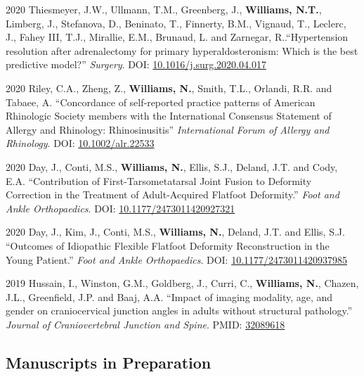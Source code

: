 \documentclass[12pt,letterpaper]{report}
\begin{document}
    \begin{tablist}
    
        	\item[2020] \tab Thiesmeyer, J.W., Ullmann, T.M., Greenberg, J., \textbf{Williams, N.T.}, Limberg, J., Stefanova, D., Beninato, T., Finnerty, B.M., Vignaud, T., Leclerc, J., Fahey III, T.J., Mirallie, E.M., Brunaud, L. and Zarnegar, R..\enquote{Hypertension resolution after adrenalectomy for primary hyperaldosteronism: Which is the best predictive model?} \textit{Surgery}. DOI: \href{https://doi.org/10.1016/j.surg.2020.04.017}{10.1016/j.surg.2020.04.017}  
	
	\item[2020] \tab Riley, C.A., Zheng, Z., \textbf{Williams, N.}, Smith, T.L., Orlandi, R.R. and Tabaee, A. \enquote{Concordance of self‐reported practice patterns of American Rhinologic Society members with the International Consensus Statement of Allergy and Rhinology: Rhinosinusitis} \textit{International Forum of Allergy and Rhinology}. DOI: \href{https://doi.org/10.1002/alr.22533}{10.1002/alr.22533} 
	
	\item[2020] \tab Day, J., Conti, M.S., \textbf{Williams, N.}, Ellis, S.J., Deland, J.T. and Cody, E.A. \enquote{Contribution of First-Tarsometatarsal Joint Fusion to Deformity Correction in the Treatment of Adult-Acquired Flatfoot Deformity.} \textit{Foot and Ankle Orthopaedics}. DOI: \href{https://doi.org/10.1177/2473011420927321}{10.1177/2473011420927321}
	
	\item[2020] \tab Day, J., Kim, J., Conti, M.S., \textbf{Williams, N.}, Deland, J.T. and Ellis, S.J. \enquote{Outcomes of Idiopathic Flexible Flatfoot Deformity Reconstruction in the Young Patient.} \textit{Foot and Ankle Orthopaedics}. DOI: \href{https://doi.org/10.1177/2473011420937985}{10.1177/2473011420937985}

	\item[2019] \tab Hussain, I., Winston, G.M., Goldberg, J., Curri, C., \textbf{Williams, N.}, Chazen, J.L., Greenfield, J.P. and Baaj, A.A. \enquote{Impact of imaging modality, age, and gender on craniocervical junction angles in adults without structural pathology.} \textit{Journal of Craniovertebral Junction and Spine}. PMID: \href{https://www.ncbi.nlm.nih.gov/pubmed/32089618}{32089618}

    \end{tablist}
    
    \subsection*{Manuscripts in Preparation}
    
\end{document}

